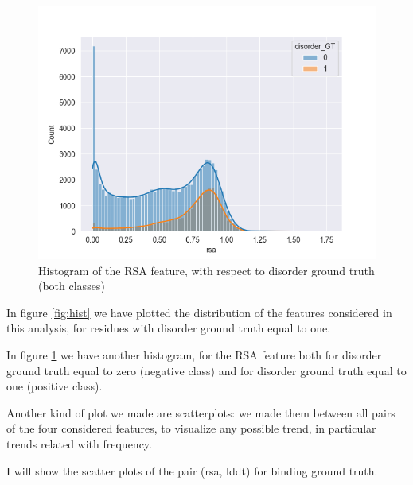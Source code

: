 \begin{figure}[h!]
    \centering
    \includegraphics{res/analysis/plots/hue-histplot_rsa.png}
    \caption{Histogram of the RSA feature, with respect to disorder ground truth (both classes)}
    \label{fig:histRsa}
\end{figure}

In figure \ref{fig:hist} we have plotted the distribution of the features considered in this analysis, for residues with disorder ground truth equal to one.

In figure \ref{fig:histRsa} we have another histogram, for the RSA feature both for disorder ground truth equal to zero (negative class) and for disorder ground truth equal to one (positive class).

Another kind of plot we made are scatterplots: we made them between all pairs of the four considered features, to visualize any possible trend, in particular trends related with frequency.

I will show the scatter plots of the pair (rsa, lddt) for binding ground truth.

